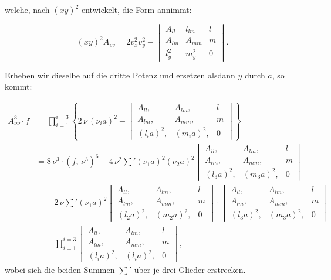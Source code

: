 welche, nach $(xy)^2$ entwickelt, die Form annimmt:

\[
(xy)^2 A_{vv} = 2v_x^2v_y^2 -
\begin{vmatrix}
A_{ll} & l_{lm} & l \\
A_{lm} & A_{mm} & m \\
l_y^2 & m_y^2 & 0
\end{vmatrix}.
\]

Erheben wir dieselbe auf die dritte Potenz und ersetzen alsdann $y$ durch $a$, so kommt:


\[
\begin{aligned}
A_{\nu\nu}^3\cdot f&=\prod_{i=1}^{i=3}\left\{2\,\nu\,(\nu_ia)^2-\begin{vmatrix}A_{ll}, & A_{lm}, & l\\ A_{lm}, & A_{mm}, & m\\ (l_ia)^2, & (m_ia)^2, & 0\end{vmatrix}\right\}\\
&=8\,\nu^3\cdot(f,\,\nu^3)^6-4\,\nu^2\sum{}'(\nu_1a)^2(\nu_2a)^2\begin{vmatrix}A_{ll}, & A_{lm}, & l\\ A_{lm}, & A_{mm}, & m\\ (l_3a)^2, & (m_3a)^2, & 0\end{vmatrix}\\
&\quad+2\,\nu\sum{}'(\nu_1a)^2\begin{vmatrix}A_{ll}, & A_{lm}, & l\\ A_{lm}, & A_{mm}, & m\\ (l_2a)^2, & (m_2a)^2, & 0\end{vmatrix}\cdot\begin{vmatrix}A_{ll}, & A_{lm}, & l\\ A_{lm}, & A_{mm}, & m\\ (l_3a)^2, & (m_3a)^2, & 0\end{vmatrix}\\
&\quad-\prod_{i=1}^{i=3}\begin{vmatrix}A_{ll}, & A_{lm}, & l\\ A_{lm}, & A_{mm}, & m\\ (l_ia)^2, & (l_ia)^2, & 0\end{vmatrix},%
\end{aligned}
\]
wobei sich die beiden Summen $\sum{}'$ über je drei Glieder erstrecken.

